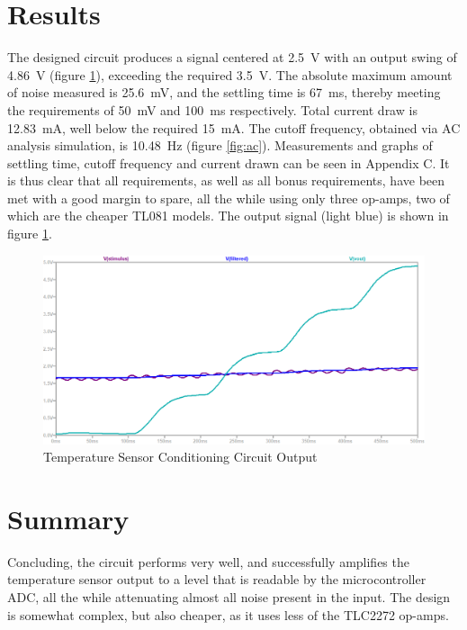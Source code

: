 \section{Results} \label{sec:temp_results}
The designed circuit produces a signal centered at \SI{2.5}{\volt} with an output swing of \SI{4.86}{\volt} (figure \ref{fig:vout}), exceeding the required \SI{3.5}{\volt}. The absolute maximum amount of noise measured is \SI{25.6}{\milli\volt}, and the settling time is \SI{67}{ms}, thereby meeting the requirements of \SI{50}{\milli\volt} and \SI{100}{ms} respectively. Total current draw is \SI{12.83}{mA}, well below the required \SI{15}{mA}. The cutoff frequency, obtained via AC analysis simulation, is \SI{10.48}{Hz} (figure \ref{fig:ac}). Measurements and graphs of settling time, cutoff frequency and current drawn can be seen in Appendix C. It is thus clear that all requirements, as well as all bonus requirements, have been met with a good margin to spare, all the while using only three op-amps, two of which are the cheaper TL081 models. The output signal (light blue) is shown in figure \ref{fig:vout}.

\begin{figure}[h]
    \centering
    \includegraphics[width = 1\textwidth]{Figures/vout.png}
    \caption{Temperature Sensor Conditioning Circuit Output}
    \label{fig:vout}
\end{figure}

\section{Summary}\label{sec:temp_summary}
Concluding, the circuit performs very well, and successfully amplifies the temperature sensor output to a level that is readable by the microcontroller ADC, all the while attenuating almost all noise present in the input. The design is somewhat complex, but also cheaper, as it uses less of the TLC2272 op-amps.


